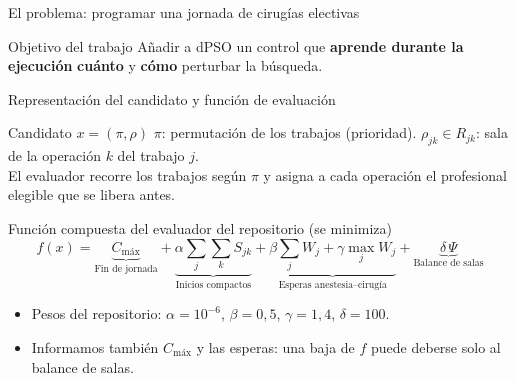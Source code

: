 \documentclass[aspectratio=169,11pt]{beamer}
\newcommand{\best}[1]{\textcolor{best}{\textbf{#1}}}
\newcommand{\Cmax}{C_{\text{máx}}}
\newcommand{\dc}{{,}}%
\begin{document}
\begin{frame}{El problema: programar una jornada de cirugías electivas}
  \vspace{0.1cm}
  \begin{exampleblock}{Objetivo del trabajo}
    \small
    Añadir a dPSO un control que \best{aprende durante la ejecución} \textbf{cuánto} y \textbf{cómo} perturbar la búsqueda.
  \end{exampleblock}
\end{frame}

\begin{frame}{Representación del candidato y función de evaluación}
  \begin{block}{Candidato $x=(\pi,\rho)$}
    \small
    $\pi$: permutación de los trabajos (prioridad). \quad $\rho_{jk}\in R_{jk}$: sala de la operación $k$ del trabajo $j$.\\
    El evaluador recorre los trabajos según $\pi$ y asigna a cada operación el profesional elegible que se libera antes.
  \end{block}

  \vspace{0.1cm}
  \begin{exampleblock}{Función compuesta del evaluador del repositorio (se minimiza)}
    \small
    $$f(x) = \underbrace{\Cmax}_{\text{Fin de jornada}}
      + \underbrace{\alpha \sum_{j}\sum_{k} S_{jk}}_{\text{Inicios compactos}}
      + \underbrace{\beta \sum_{j} W_j + \gamma \max_{j} W_j}_{\text{Esperas anestesia--cirugía}}
      + \underbrace{\delta\, \Psi}_{\text{Balance de salas}}$$
    \vspace{-0.25cm}
    \begin{itemize}
      \item Pesos del repositorio: $\alpha=10^{-6}$, $\beta=0\dc5$, $\gamma=1\dc4$, $\delta=100$.
      \item Informamos también $\Cmax$ y las esperas: una baja de $f$ puede deberse solo al balance de salas.
    \end{itemize}
  \end{exampleblock}
\end{frame}
\end{document}
